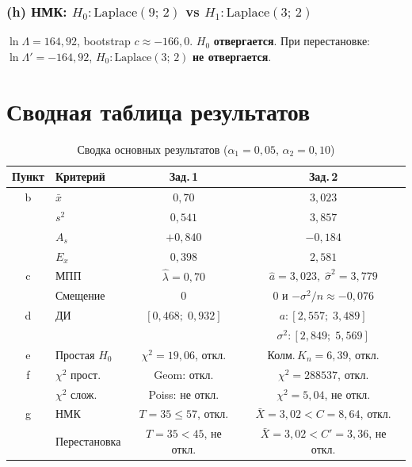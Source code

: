 \documentclass[12pt,a4paper]{article}
\newcommand{\xbar}{\bar{x}}
\begin{document}
	\subsubsection*{(h) НМК: $H_0\colon\mathrm{Laplace}(9;\,2)$
		vs $H_1\colon\mathrm{Laplace}(3;\,2)$}
	$\ln\Lambda = 164{,}92$, bootstrap $c\approx-166{,}0$. $H_0$ \textbf{отвергается}.
	При перестановке: $\ln\Lambda' = -164{,}92$, $H_0\colon\mathrm{Laplace}(3;\,2)$
	\textbf{не отвергается}.
	
	\newpage
	\section{Сводная таблица результатов}
	
	\begin{table}[H]
		\centering
		\renewcommand{\arraystretch}{1.3}
		\begin{tabular}{clcc}
			\toprule
			\textbf{Пункт} & \textbf{Критерий} & \textbf{Зад.\,1} & \textbf{Зад.\,2} \\
			\midrule
			b & $\xbar$ & $0{,}70$ & $3{,}023$ \\
			& $s^2$   & $0{,}541$ & $3{,}857$ \\
			& $A_s$   & $+0{,}840$ & $-0{,}184$ \\
			& $E_x$   & $0{,}398$ & $2{,}581$ \\
			\midrule
			c & МПП     & $\hat\lambda=0{,}70$ & $\hat{a}=3{,}023,\;\hat\sigma^2=3{,}779$ \\
			& Смещение & $0$ & $0$ и $-\sigma^2/n\approx-0{,}076$ \\
			\midrule
			d & ДИ      & $[0{,}468;\;0{,}932]$ & $a:[2{,}557;\;3{,}489]$ \\
			&         &                        & $\sigma^2:[2{,}849;\;5{,}569]$ \\
			\midrule
			e & Простая $H_0$ & $\chi^2=19{,}06$, откл. & Колм.\,$K_n=6{,}39$, откл. \\
			\midrule
			f & $\chi^2$ прост. & Geom: откл. & $\chi^2=288537$, откл. \\
			& $\chi^2$ слож.  & Poiss: не откл. & $\chi^2=5{,}04$, не откл. \\
			\midrule
			g & НМК & $T=35\le57$, откл. & $\bar{X}=3{,}02<C=8{,}64$, откл. \\
			& Перестановка & $T=35<45$, не откл. & $\bar{X}=3{,}02<C'=3{,}36$, не откл. \\
			\bottomrule
		\end{tabular}
		\caption{Сводка основных результатов ($\alpha_1=0{,}05$, $\alpha_2=0{,}10$)}
	\end{table}
	
	
\end{document}
